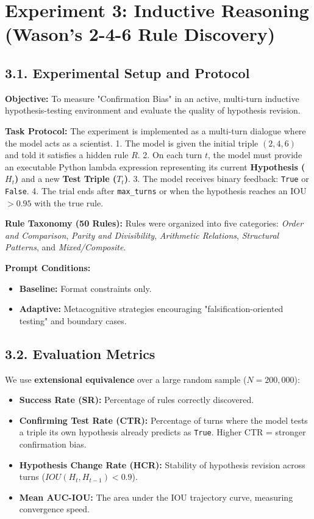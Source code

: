 \section*{Experiment 3: Inductive Reasoning (Wason's 2-4-6 Rule Discovery)}

\subsection*{3.1. Experimental Setup and Protocol}
\textbf{Objective:} To measure "Confirmation Bias" in an active, multi-turn inductive hypothesis-testing environment and evaluate the quality of hypothesis revision.

\textbf{Task Protocol:}
The experiment is implemented as a multi-turn dialogue where the model acts as a scientist.
1. The model is given the initial triple $(2, 4, 6)$ and told it satisfies a hidden rule $R$.
2. On each turn $t$, the model must provide an executable Python lambda expression representing its current \textbf{Hypothesis ($H_t$)} and a new \textbf{Test Triple ($T_t$)}.
3. The model receives binary feedback: \texttt{True} or \texttt{False}.
4. The trial ends after \texttt{max\_turns} or when the hypothesis reaches an IOU $> 0.95$ with the true rule.

\textbf{Rule Taxonomy (50 Rules):}
Rules were organized into five categories: \textit{Order and Comparison}, \textit{Parity and Divisibility}, \textit{Arithmetic Relations}, \textit{Structural Patterns}, and \textit{Mixed/Composite}.

\textbf{Prompt Conditions:}
\begin{itemize}
    \item \textbf{Baseline:} Format constraints only.
    \item \textbf{Adaptive:} Metacognitive strategies encouraging "falsification-oriented testing" and boundary cases.
\end{itemize}

\subsection*{3.2. Evaluation Metrics}
We use \textbf{extensional equivalence} over a large random sample ($N=200,000$):
\begin{itemize}
    \item \textbf{Success Rate (SR):} Percentage of rules correctly discovered.
    \item \textbf{Confirming Test Rate (CTR):} Percentage of turns where the model tests a triple its own hypothesis already predicts as \texttt{True}. Higher CTR = stronger confirmation bias.
    \item \textbf{Hypothesis Change Rate (HCR):} Stability of hypothesis revision across turns ($IOU(H_t, H_{t-1}) < 0.9$).
    \item \textbf{Mean AUC-IOU:} The area under the IOU trajectory curve, measuring convergence speed.
\end{itemize}

